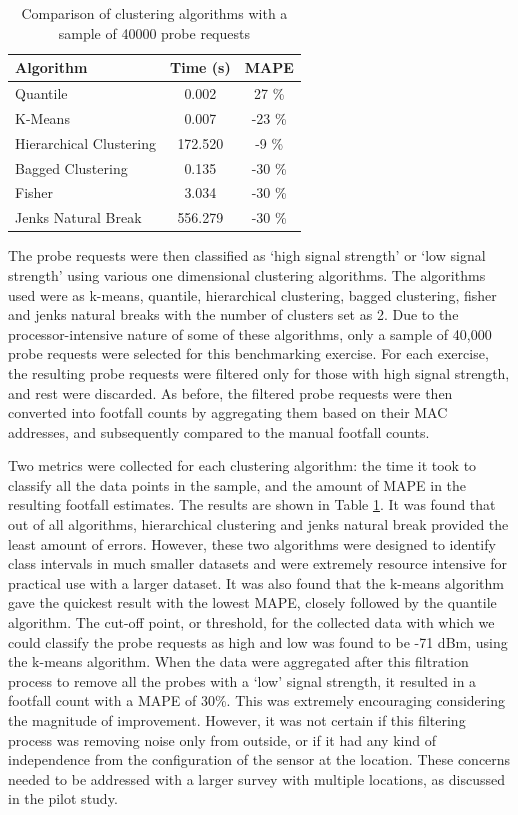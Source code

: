 \begin{table}
  \footnotesize
  \caption{Comparison of clustering algorithms with a sample of 40000 probe requests}
  \centering
  \begin{tabular}{lcc} 
    \toprule
     Algorithm				      	& Time (s)& MAPE\\
    \midrule
     Quantile				        	& 0.002 	&  27 \% \\
     K-Means			 	        	& 0.007 	& -23 \% \\
     Hierarchical Clustering	& 172.520	&  -9 \% \\
     Bagged Clustering 		  	& 0.135 	& -30 \% \\
     Fisher 				        	& 3.034 	& -30 \% \\
     Jenks Natural Break 	   	& 556.279	& -30 \% \\
     \bottomrule
  \end{tabular}
  \label{table:processing:oxst:classification}
\end{table}

The probe requests were then classified as ‘high signal strength’ or ‘low signal strength’ using various one dimensional clustering algorithms.
The algorithms used were as k-means, quantile, hierarchical clustering, bagged clustering, fisher and jenks natural breaks with the number of clusters set as 2.
Due to the processor-intensive nature of some of these algorithms, only a sample of 40,000 probe requests were selected for this benchmarking exercise.
For each exercise, the resulting probe requests were filtered only for those with high signal strength, and rest were discarded.
As before, the filtered probe requests were then converted into footfall counts by aggregating them based on their MAC addresses, and subsequently compared to the manual footfall counts.

Two metrics were collected for each clustering algorithm: the time it took to classify all the data points in the sample, and the amount of MAPE in the resulting footfall estimates.
The results are shown in Table \ref{table:processing:oxst:classification}.
It was found that out of all algorithms, hierarchical clustering and jenks natural break provided the least amount of errors.
However, these two algorithms were designed to identify class intervals in much smaller datasets and were extremely resource intensive for practical use with a larger dataset.
It was also found that the k-means algorithm gave the quickest result with the lowest MAPE, closely followed by the quantile algorithm.
The cut-off point, or threshold, for the collected data with which we could classify the probe requests as high and low was found to be -71 dBm, using the k-means algorithm.
When the data were aggregated after this filtration process to remove all the probes with a ‘low’ signal strength, it resulted in a footfall count with a MAPE of 30\%.
This was extremely encouraging considering the magnitude of improvement.
However, it was not certain if this filtering process was  removing noise only from outside, or if it had any kind of independence from the configuration of the sensor at the location.
These concerns needed to be addressed with a larger survey with multiple locations, as discussed in the pilot study.


